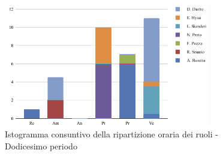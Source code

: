 \begin{figure}[H]
    \centering
    \includegraphics[width=0.8\textwidth]{../Images/graficoConsPrev12.png}
    \caption{Istogramma consuntivo della ripartizione oraria dei ruoli - Dodicesimo periodo}
    \label{fig:Consuntivo_ripartizione_oraria_12}
\end{figure}